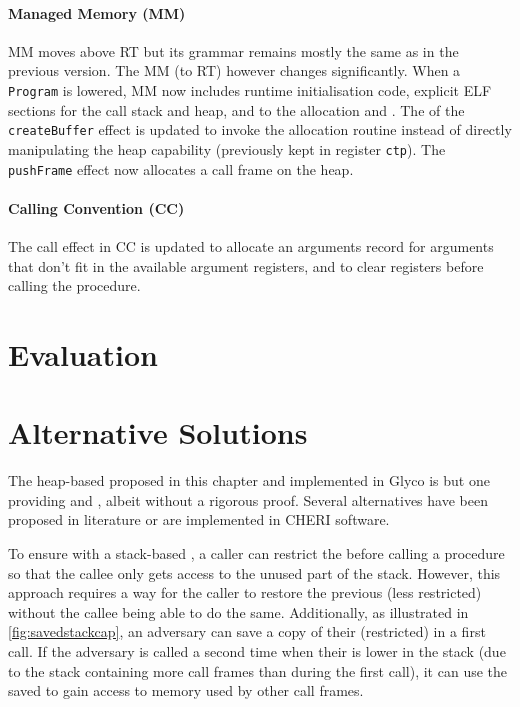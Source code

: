 \documentclass[main.tex]{subfiles}
\begin{document}
\paragraph{Managed Memory (MM)} MM moves above RT but its grammar remains mostly the same as in the previous version. The MM (to RT)  however changes significantly. When a \texttt{Program} is lowered, MM now includes runtime initialisation code, explicit ELF sections for the call stack and heap, and  to the allocation and  . The  of the \texttt{createBuffer} effect is updated to invoke the allocation routine instead of directly manipulating the heap capability (previously kept in register \texttt{ctp}). The \texttt{pushFrame} effect now allocates a call frame on the heap.

\paragraph{Calling Convention (CC)} The call effect in CC is updated to allocate an arguments record for arguments that don't fit in the available argument registers, and to clear registers before calling the procedure.


\section{Evaluation} \label{sct:ghscc-eval}

\section{Alternative Solutions} \label{sct:alt-scc}
The heap-based  proposed in this chapter and implemented in Glyco is but one  providing  and , albeit without a rigorous proof. Several alternatives have been proposed in literature or are implemented in CHERI software.

To ensure  with a stack-based , a caller can restrict the  before calling a procedure so that the callee only gets access to the unused part of the stack. However, this approach requires a way for the caller to restore the previous (less restricted)  without the callee being able to do the same. Additionally, as illustrated in \cref{fig:savedstackcap}, an adversary can save a copy of their (restricted)  in a first call. If the adversary is called a second time when their  is lower in the stack (due to the stack containing more call frames than during the first call), it can use the saved  to gain access to memory used by other call frames.
\end{document}
